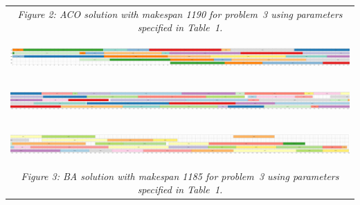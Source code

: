 \documentclass[paper=a4, fontsize=9pt]{scrartcl}
\begin{document}
\begin{landscape}
{\begin{table}
\begin{tabular}{l}
\multicolumn{1}{c}{\textit{Figure 2: \acf{ACO} solution with makespan 1190 for problem~3 using parameters specified in Table~1.}}\\[1.2cm]
\includegraphics[height=40pt]{figures/solution_ba_instance_3_1_scaled}\\[0.15cm]
\hspace{0.90909pt}\includegraphics[height=40pt]{figures/solution_ba_instance_3_2_scaled}\\[0.15cm]
\hspace{0.90909pt}\includegraphics[height=40pt]{figures/solution_ba_instance_3_3_scaled}\\
\multicolumn{1}{c}{\textit{Figure 3: \acf{BA} solution with makespan 1185 for problem~3 using parameters specified in Table~1.}}\\
\end{tabular}
\end{table}
}

\end{landscape}
\end{document}
